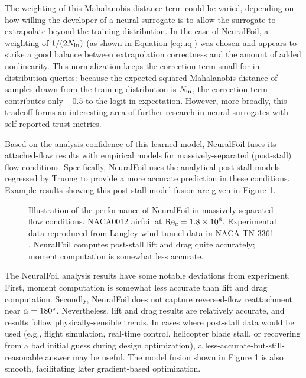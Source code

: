 \documentclass[journal]{new-aiaa}
\begin{document}
The weighting of this Mahalanobis distance term could be varied, depending on how willing the developer of a neural surrogate is to allow the surrogate to extrapolate beyond the training distribution. In the case of NeuralFoil, a weighting of $1 / (2 N_{\rm in})$ (as shown in Equation \ref{eq:uq}) was chosen and appears to strike a good balance between extrapolation correctness and the amount of added nonlinearity. This normalization keeps the correction term small for in-distribution queries: because the expected squared Mahalanobis distance of samples drawn from the training distribution is $N_{\rm in}$, the correction term contributes only $-0.5$ to the logit in expectation. However, more broadly, this tradeoff forms an interesting area of further research in neural surrogates with self-reported trust metrics.

Based on the analysis confidence of this learned model, NeuralFoil fuses its attached-flow results with empirical models for massively-separated (post-stall) flow conditions. Specifically, NeuralFoil uses the analytical post-stall models regressed by Truong \cite{truongAnalyticalModelAirfoil2020} to provide a more accurate prediction in these conditions. Example results showing this post-stall model fusion are given in Figure \ref{fig:post_stall_extrapolation}.

\begin{figure}[H]
    \centering
    
    \caption{Illustration of the performance of NeuralFoil in massively-separated flow conditions. NACA0012 airfoil at $\rm Re_c=1.8\times 10^6$. Experimental data reproduced from Langley wind tunnel data in NACA TN 3361 \cite{critzosAerodynamicCharacteristicsNACA1955}. NeuralFoil computes post-stall lift and drag quite accurately; moment computation is somewhat less accurate.}
    \label{fig:post_stall_extrapolation}
\end{figure}

The NeuralFoil analysis results have some notable deviations from experiment. First, moment computation is somewhat less accurate than lift and drag computation. Secondly, NeuralFoil does not capture reversed-flow reattachment near $\alpha=180\degree$. Nevertheless, lift and drag results are relatively accurate, and results follow physically-sensible trends. In cases where post-stall data would be used (e.g., flight simulation, real-time control, helicopter blade stall, or recovering from a bad initial guess during design optimization), a less-accurate-but-still-reasonable answer may be useful. The model fusion shown in Figure \ref{fig:post_stall_extrapolation} is also smooth, facilitating later gradient-based optimization.
\end{document}
